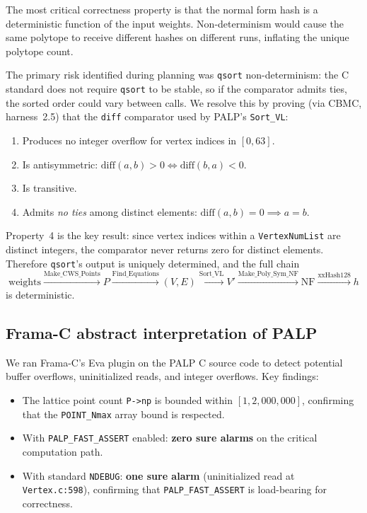 \documentclass[12pt,a4paper]{article}
\theoremstyle{definition}
\newcommand{\NF}{\mathrm{NF}}
\begin{document}
The most critical correctness property is that the normal form hash is
a deterministic function of the input weights.  Non-determinism would
cause the same polytope to receive different hashes on different runs,
inflating the unique polytope count.

The primary risk identified during planning was \texttt{qsort}
non-determinism: the C standard does not require \texttt{qsort} to be
stable, so if the comparator admits ties, the sorted order could vary
between calls.  We resolve this by proving (via CBMC, harness~2.5) that
the \texttt{diff} comparator used by PALP's \texttt{Sort\_VL}:
\begin{enumerate}
  \item Produces no integer overflow for vertex indices in $[0, 63]$.
  \item Is antisymmetric: $\mathrm{diff}(a,b) > 0 \iff \mathrm{diff}(b,a) < 0$.
  \item Is transitive.
  \item Admits \emph{no ties} among distinct elements:
        $\mathrm{diff}(a,b) = 0 \implies a = b$.
\end{enumerate}
Property~4 is the key result: since vertex indices within a
\texttt{VertexNumList} are distinct integers, the comparator never
returns zero for distinct elements.  Therefore \texttt{qsort}'s output
is uniquely determined, and the full chain
\[
  \text{weights} \xrightarrow{\text{Make\_CWS\_Points}} P
  \xrightarrow{\text{Find\_Equations}} (V, E)
  \xrightarrow{\text{Sort\_VL}} V'
  \xrightarrow{\text{Make\_Poly\_Sym\_NF}} \NF
  \xrightarrow{\text{xxHash128}} h
\]
is deterministic.

\subsection{Frama-C abstract interpretation of PALP}

We ran Frama-C's Eva plugin on the PALP C source code to detect potential
buffer overflows, uninitialized reads, and integer overflows.  Key
findings:
\begin{itemize}
  \item The lattice point count \texttt{P->np} is bounded within
        $[1, 2{,}000{,}000]$, confirming that the \texttt{POINT\_Nmax}
        array bound is respected.
  \item With \texttt{PALP\_FAST\_ASSERT} enabled: \textbf{zero sure
        alarms} on the critical computation path.
  \item With standard \texttt{NDEBUG}: \textbf{one sure alarm}
        (uninitialized read at \texttt{Vertex.c:598}), confirming that
        \texttt{PALP\_FAST\_ASSERT} is load-bearing for correctness.
\end{itemize}
\end{document}
